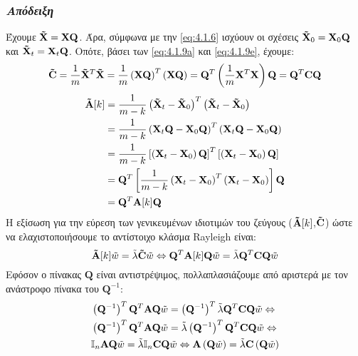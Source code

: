 \subsubsection*{\small{\textit{Απόδειξη}}}
Έχουμε $\mathbf{\Tilde{X}} = \mathbf{X} \mathbf{Q}$. Άρα, σύμφωνα με την \eqref{eq:4.1.6} ισχύουν οι σχέσεις $\mathbf{\Tilde{X}}_0 = \mathbf{X}_0 \mathbf{Q}$ και $\mathbf{\Tilde{X}}_t = \mathbf{X}_t \mathbf{Q}$.
Οπότε, βάσει των \eqref{eq:4.1.9a} και \eqref{eq:4.1.9e}, έχουμε:
$$
\mathbf{\Tilde{C}} = \frac{1}{m} \mathbf{\Tilde{X}}^T \mathbf{\Tilde{X}}
= \frac{1}{m} \left ( \mathbf{X} \mathbf{Q}  \right )^T \left ( \mathbf{X} \mathbf{Q}  \right ) = \mathbf{Q}^T 
\left ( \frac{1}{m} \mathbf{X}^T \mathbf{X}  \right ) \mathbf{Q} = 
\mathbf{Q}^T \mathbf{C} \mathbf{Q}
$$
\begin{align*}
\mathbf{\Tilde{A}}[k] &= \frac{1}{m-k} \left ( \mathbf{\Tilde{X}}_t - \mathbf{\Tilde{X}}_0\right )^T \left ( \mathbf{\Tilde{X}}_t - \mathbf{\Tilde{X}}_0\right )  \\
& = \frac{1}{m-k} \left ( \mathbf{X}_t \mathbf{Q} - \mathbf{X}_0 \mathbf{Q}    \right )^T \left ( \mathbf{X}_t \mathbf{Q} - \mathbf{X}_0 \mathbf{Q}    \right )  \\
& = \frac{1}{m-k} \left [ \left ( \mathbf{X}_t - \mathbf{X}_0 \right ) \mathbf{Q} \right ]^T \left [ \left ( \mathbf{X}_t - \mathbf{X}_0 \right ) \mathbf{Q} \right ]  \\
& =\mathbf{Q}^T \left [ \frac{1}{m-k} \left ( \mathbf{X}_t - \mathbf{X}_0\right )^T \left ( \mathbf{X}_t - \mathbf{X}_0\right ) \right ] \mathbf{Q} \\
&= \mathbf{Q}^T \mathbf{A}[k] \mathbf{Q}
\end{align*}
Η εξίσωση για την εύρεση των γενικευμένων ιδιοτιμών του ζεύγους ($\mathbf{\Tilde{A}}[k]$,$\mathbf{\Tilde{C}}$) ώστε να ελαχιστοποιήσουμε το αντίστοιχο κλάσμα Rayleigh είναι:
$$
\mathbf{\Tilde{A}}[k] \Tilde{w} = \Tilde{\lambda} \mathbf{\Tilde{C}} \Tilde{w} \Leftrightarrow \mathbf{Q}^T \mathbf{A}[k] \mathbf{Q} \Tilde{w} = \Tilde{\lambda} \mathbf{Q}^T \mathbf{C} \mathbf{Q} \Tilde{w}
$$
Εφόσον ο πίνακας $\mathbf{Q}$ είναι αντιστρέψιμος, πολλαπλασιάζουμε από αριστερά με τον ανάστροφο πίνακα του $\mathbf{Q}^{-1}$:
\begin{align*}
&\left ( \mathbf{Q}^{-1} \right )^T \mathbf{Q}^T \mathbf{A} \mathbf{Q} \Tilde{w} = \left ( \mathbf{Q}^{-1} \right )^T \Tilde{\lambda} \mathbf{Q}^T \mathbf{C} \mathbf{Q} \Tilde{w} \Leftrightarrow \\
&\left ( \mathbf{Q}^{-1} \right )^T \mathbf{Q}^T \mathbf{A} \mathbf{Q} \Tilde{w} = \Tilde{\lambda} \left ( \mathbf{Q}^{-1} \right )^T \mathbf{Q}^T \mathbf{C} \mathbf{Q} \Tilde{w} \Leftrightarrow \\
&\mathbb{I}_n \mathbf{A} \mathbf{Q} \Tilde{w} = \Tilde{\lambda} \mathbb{I}_n \mathbf{C} \mathbf{Q} \Tilde{w} \Leftrightarrow 
\mathbf{A}\left ( \mathbf{Q} \Tilde{w} \right) = \Tilde{\lambda} \mathbf{C} \left ( \mathbf{Q} \Tilde{w} \right )
\end{align*}

